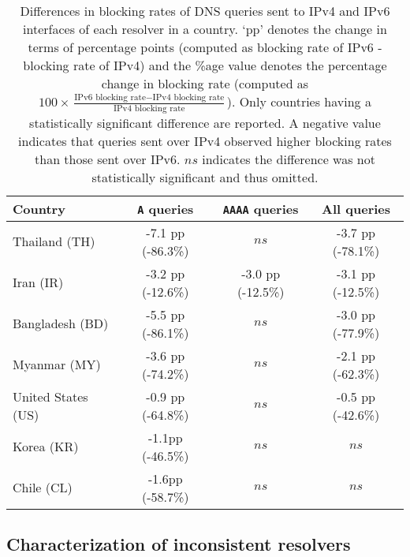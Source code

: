 \begin{table}[t]
  \centering
  \small
  \scalebox{\tabularscale} {
  \begin{tabular}{lccc}%
    \toprule
    {\bf Country}&{\bf {\tt A} queries }&{\bf {\tt AAAA} queries} & {\bf All queries}
    \\ \midrule
    Thailand (TH)      & -7.1 pp (-86.3\%) & $ns$              & -3.7 pp (-78.1\%) \\
    Iran (IR)          & -3.2 pp (-12.6\%) & -3.0 pp (-12.5\%) & -3.1 pp (-12.5\%) \\ 
    Bangladesh (BD)    & -5.5 pp (-86.1\%) & $ns$              & -3.0 pp (-77.9\%) \\
    Myanmar (MY)       & -3.6 pp (-74.2\%) & $ns$              & -2.1 pp (-62.3\%) \\
    United States (US) & -0.9 pp (-64.8\%) & $ns$              & -0.5 pp (-42.6\%) \\
    \midrule
    Korea (KR)         & -1.1pp (-46.5\%) & $ns$    & $ns$ \\
    Chile (CL)         & -1.6pp (-58.7\%)  & $ns$    & $ns$ \\
    \bottomrule
  \end{tabular}
  }
  \caption{Differences in blocking rates of DNS queries sent to IPv4 and IPv6
  interfaces of each resolver in a country. `pp' denotes the change in
  terms of percentage points (computed as blocking rate of IPv6 - blocking
  rate of IPv4) and the \%age value denotes the percentage change in blocking rate
  (computed as 
  $
  100 \times \frac{\text{IPv6 blocking rate} - \text{IPv4 blocking rate}}
  {\text{IPv4 blocking rate}}
  $). 
  Only countries having a statistically
  significant difference are reported. A negative value indicates that queries
  sent over IPv4 observed higher blocking rates than those sent over IPv6. $ns$
  indicates the difference was not statistically significant and thus omitted.}
  \label{tab:infrastructure:countries}
\end{table}

\subsection{Characterization of inconsistent resolvers}
\label{sec:infrastructure:resolvers}


